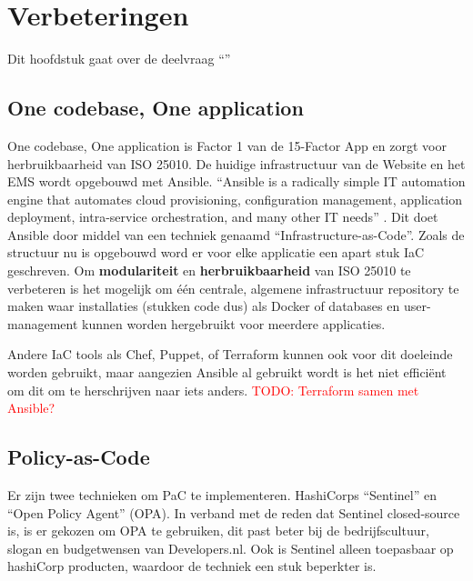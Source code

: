 \chapter{Verbeteringen}

\label{Chapter5}

Dit hoofdstuk gaat over de deelvraag \enquote{\deelverbetering}

\section{One codebase, One application}
One codebase, One application is Factor 1 van de 15-Factor App en zorgt voor herbruikbaarheid van ISO 25010. De huidige infrastructuur van de Website en het EMS wordt opgebouwd met Ansible. \enquote{Ansible is a radically simple IT automation engine that automates cloud provisioning, configuration management, application deployment, intra-service orchestration, and many other IT needs} \parencite{Ansible}. Dit doet Ansible door middel van een techniek genaamd \enquote{Infrastructure-as-Code}. Zoals de structuur nu is opgebouwd word er voor elke applicatie een apart stuk IaC geschreven. Om \textbf{modulariteit} en \textbf{herbruikbaarheid} van ISO 25010 \parencite{ISO25010} te verbeteren is het mogelijk om één centrale, algemene infrastructuur repository te maken waar installaties (stukken code dus) als Docker of databases en user-management kunnen worden hergebruikt voor meerdere applicaties. 

Andere IaC tools als Chef, Puppet, of Terraform kunnen ook voor dit doeleinde worden gebruikt, maar aangezien Ansible al gebruikt wordt is het niet efficiënt om dit om te herschrijven naar iets anders. \textcolor{red}{TODO: Terraform samen met Ansible?} %

\section{Policy-as-Code}
Er zijn twee technieken om PaC te implementeren. HashiCorps \enquote{Sentinel} en \enquote{Open Policy Agent} (OPA). In verband met de reden dat Sentinel closed-source is, is er gekozen om OPA te gebruiken, dit past beter bij de bedrijfscultuur, slogan en budgetwensen van Developers.nl. Ook is Sentinel alleen toepasbaar op hashiCorp producten, waardoor de techniek een stuk beperkter is.

